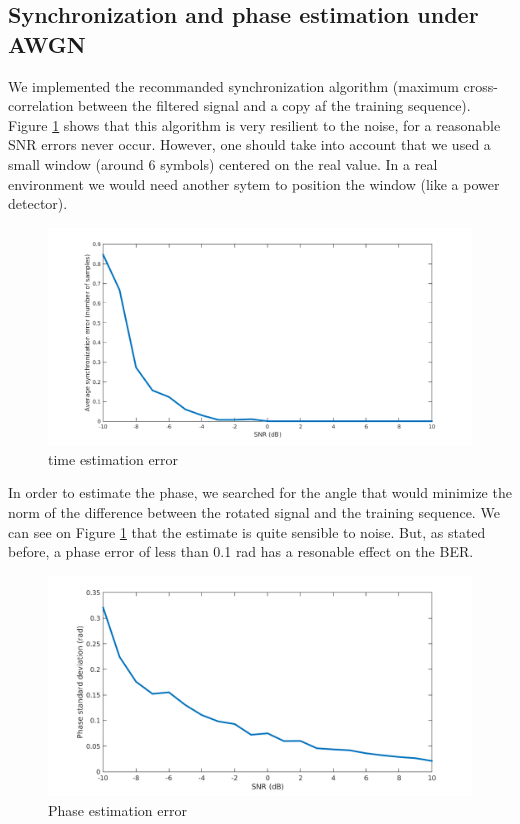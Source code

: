 \documentclass[a4paper,12pt]{article}
\begin{document}
\subsection{Synchronization and phase estimation under AWGN}
We implemented the recommanded synchronization algorithm (maximum cross-correlation between the filtered signal and a copy af the training sequence). Figure \ref{SE} shows that this algorithm is very resilient to the noise, for a reasonable SNR errors never occur. However, one should take into account that we used a small window (around 6 symbols) centered on the real value. In a real environment we would need another sytem to position the window (like a power detector). 
\begin{figure}[ht]
\centering
\begin{center}
\includegraphics[scale=0.50]{SynError.png}
\caption{time estimation error}
\label{SE}
\end{center}
\end{figure}

In order to estimate the phase, we searched for the angle that would minimize the norm of the difference between the rotated signal and the training sequence. We can see on Figure \ref{SE} that the estimate is quite sensible to noise. But, as stated before, a phase error of less than 0.1 rad has a resonable effect on the BER.
\begin{figure}[ht]
\centering
\begin{center}
\includegraphics[scale=0.50]{PhaseError.png}
\caption{Phase estimation error}
\label{PE}
\end{center}
\end{figure}
\end{document}
